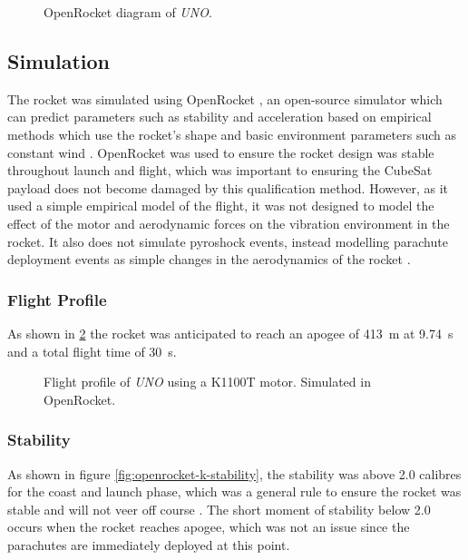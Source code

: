 \documentclass{report}
\begin{document}
\begin{figure}[H]
  
  \caption{OpenRocket diagram of \textit{UNO}.}
  \label{fig:openrocket}
\end{figure}

\subsection{Simulation}

The rocket was simulated using OpenRocket \cite{openrocket,niskanen2009}, an open-source simulator which can predict parameters such as stability and acceleration based on empirical methods which use the rocket's shape and basic environment parameters such as constant wind \cite{doi:10.1177/0954410017752730,niskanen2009}. OpenRocket was used to ensure the rocket design was stable throughout launch and flight, which was important to ensuring the CubeSat payload does not become damaged by this qualification method. However, as it used a simple empirical model of the flight, it was not designed to model the effect of the motor and aerodynamic forces on the vibration environment in the rocket. It also does not simulate pyroshock events, instead modelling parachute deployment events as simple changes in the aerodynamics of the rocket \cite{niskanen2009}.

\subsubsection{Flight Profile}

As shown in \ref{fig:openrocket-k-launch} the rocket was anticipated to reach an apogee of \SI{413}{\metre} at \SI{9.74}{\second} and a total flight time of \SI{30}{\second}.

\begin{figure}[H]
  
  \caption{Flight profile of \textit{UNO} using a K1100T motor. Simulated in OpenRocket.}
  \label{fig:openrocket-k-launch}
\end{figure}


\subsubsection{Stability}

As shown in figure \ref{fig:openrocket-k-stability}, the stability was above 2.0 calibres for the coast and launch phase, which was a general rule to ensure the rocket was stable and will not veer off course \cite{canepa2005modern}. The short moment of stability below 2.0 occurs when the rocket reaches apogee, which was not an issue since the parachutes are immediately deployed at this point.
\end{document}
